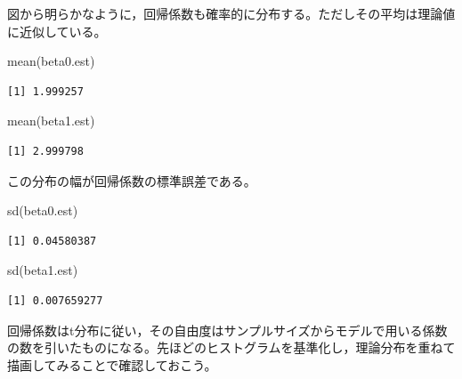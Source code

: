 \documentclass[
  a4paper,
]{ltjsbook}
\newenvironment{Shaded}{\begin{snugshade}}{\end{snugshade}}
\newcommand{\FunctionTok}[1]{\textcolor[rgb]{0.28,0.35,0.67}{#1}}
\newcommand{\NormalTok}[1]{\textcolor[rgb]{0.00,0.23,0.31}{#1}}
\begin{document}
図から明らかなように，回帰係数も確率的に分布する。ただしその平均は理論値に近似している。

\begin{Shaded}
\begin{Highlighting}[]
\FunctionTok{mean}\NormalTok{(beta0.est)}
\end{Highlighting}
\end{Shaded}

\begin{verbatim}
[1] 1.999257
\end{verbatim}

\begin{Shaded}
\begin{Highlighting}[]
\FunctionTok{mean}\NormalTok{(beta1.est)}
\end{Highlighting}
\end{Shaded}

\begin{verbatim}
[1] 2.999798
\end{verbatim}

この分布の幅が回帰係数の標準誤差である。

\begin{Shaded}
\begin{Highlighting}[]
\FunctionTok{sd}\NormalTok{(beta0.est)}
\end{Highlighting}
\end{Shaded}

\begin{verbatim}
[1] 0.04580387
\end{verbatim}

\begin{Shaded}
\begin{Highlighting}[]
\FunctionTok{sd}\NormalTok{(beta1.est)}
\end{Highlighting}
\end{Shaded}

\begin{verbatim}
[1] 0.007659277
\end{verbatim}

回帰係数はt分布に従い，その自由度はサンプルサイズからモデルで用いる係数の数を引いたものになる。先ほどのヒストグラムを基準化し，理論分布を重ねて描画してみることで確認しておこう。
\end{document}
